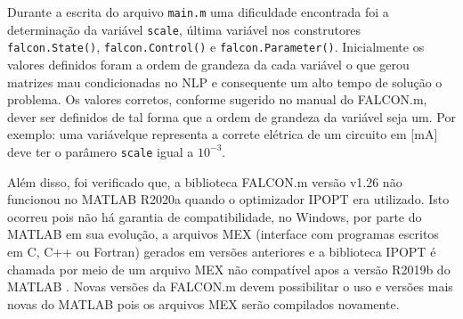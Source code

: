 Durante a escrita do arquivo \lstinline[style=Matlab-editor]{main.m} uma dificuldade encontrada foi a determinação da variável \lstinline[style=Matlab-editor]{scale}, 
última  variável nos construtores \lstinline[style=Matlab-editor]{falcon.State()}, \lstinline[style=Matlab-editor]{falcon.Control()} e \lstinline[style=Matlab-editor]{falcon.Parameter()}.
Inicialmente os valores definidos foram a ordem de grandeza da cada variável o que gerou matrizes mau condicionadas no NLP e consequente um alto tempo de solução o problema. 
Os valores corretos, conforme sugerido no manual do FALCON.m\cite{manual:Falcon}, dever ser definidos de tal forma que a ordem de grandeza da variável seja um. Por exemplo: uma variávelque
representa a correte elétrica de um circuito em [mA] deve ter o parâmero \lstinline[style=Matlab-editor]{scale} igual a $10^{-3}$. 


Além disso, foi verificado que, a biblioteca FALCON.m versão v1.26 não funcionou no MATLAB  R2020a quando o optimizador  IPOPT era utilizado.
Isto ocorreu pois não há garantia de compatibilidade, no Windows, por parte do MATLAB  em sua evolução, a arquivos MEX (interface com programas escritos em C, C++ ou Fortran) gerados em versões 
anteriores e a biblioteca IPOPT é chamada por meio de um arquivo MEX não compatível apos a versão R2019b do MATLAB . Novas versões da FALCON.m
devem possibilitar o uso e versões mais novas do MATLAB  pois os arquivos MEX serão compilados novamente.




\clearpage
